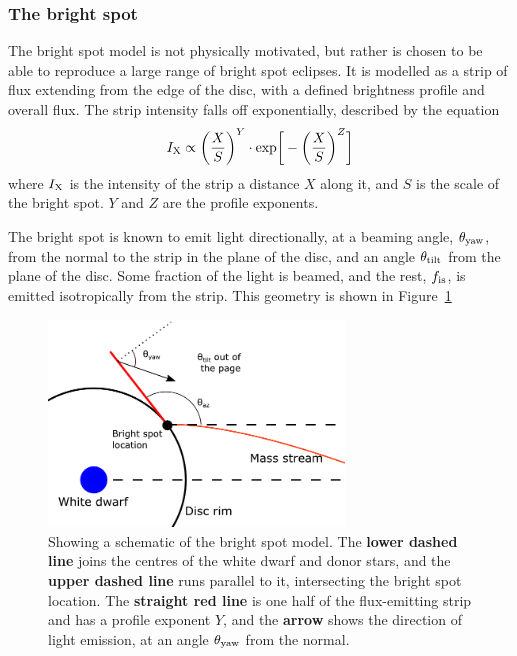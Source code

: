 \subsubsection{The bright spot}

The bright spot model is not physically motivated, but rather is chosen to be able to reproduce a large range of bright spot eclipses.
It is modelled as a strip of flux extending from the edge of the disc, with a defined brightness profile and overall flux. The strip intensity falls off exponentially, described by the equation
\begin{equation}
    I_{\rm X} \propto \bigg ( \frac{X}{S} \bigg )^Y \cdot {\rm exp} \bigg [ - \bigg (\frac{X}{S} \bigg )^Z \bigg]
\end{equation}
where $I_{\rm X}$ is the intensity of the strip a distance $X$ along it, and $S$ is the scale of the bright spot. $Y$ and $Z$ are the profile exponents.

The bright spot is known to emit light directionally, at a beaming angle, $\theta_{\rm yaw}$, from the normal to the strip in the plane of the disc, and an angle $\theta_{\rm tilt}$ from the plane of the disc.
Some fraction of the light is beamed, and the rest, $f_{\rm is}$, is emitted isotropically from the strip. This geometry is shown in Figure~\ref{fig:modelling:bright spot schematic}

\begin{figure}
    \centering
    \includegraphics[width=0.7\textwidth]{figures/modelling/bright_spot_schematic.pdf}
    \caption{Showing a schematic of the bright spot model. The {\bf lower dashed line} joins the centres of the white dwarf and donor stars, and the {\bf upper dashed line} runs parallel to it, intersecting the bright spot location. The {\bf straight red line} is one half of the flux-emitting strip and has a profile exponent $Y$, and the {\bf arrow} shows the direction of light emission, at an angle $\theta_{\rm yaw}$ from the normal.}
    \label{fig:modelling:bright spot schematic}
\end{figure}

